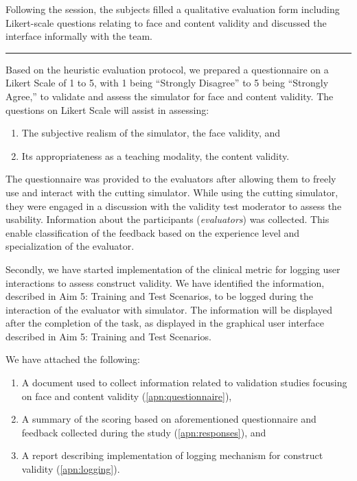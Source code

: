 Following the session, the subjects filled a qualitative evaluation form including Likert-scale questions relating to face and content validity and discussed the interface informally with the team.

\hrule%

Based on the heuristic evaluation protocol, we prepared a questionnaire on a Likert Scale of 1 to 5, with 1 being \enquote{Strongly Disagree} to 5 being \enquote{Strongly Agree,} to validate and assess the simulator for face and content validity. The questions on Likert Scale will assist in assessing:
\begin{enumerate}[\em i\em)]
  \item The subjective realism of the simulator, \ie the face validity, and
  \item Its appropriateness as a teaching modality, \ie the content validity.
\end{enumerate}

The questionnaire was provided to the evaluators after allowing them to freely use and interact with the cutting simulator. While using the cutting simulator, they were engaged in a discussion with the validity test moderator to assess the usability. Information about the participants (\emph{evaluators}) was collected. This enable classification of the feedback based on the experience level and specialization of the evaluator.

Secondly, we have started implementation of the clinical metric for logging user interactions to assess construct validity. We have identified the information, described in Aim 5: Training and Test Scenarios, to be logged during the interaction of the evaluator with simulator. The information will be displayed after the completion of the task, as displayed in the graphical user interface described in Aim 5: Training and Test Scenarios.

We have attached the following:
\begin{enumerate}[1.]
  \item A document used to collect information related to validation studies focusing on face and content validity (\autoref{apn:questionnaire}),
  \item A summary of the scoring based on aforementioned questionnaire and feedback collected during the study (\autoref{apn:responses}), and
  \item A report describing implementation of logging mechanism for construct validity (\autoref{apn:logging}).
\end{enumerate}

